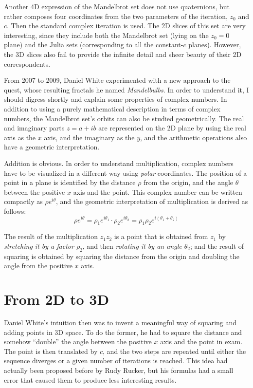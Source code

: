 \documentclass{article}
\begin{document}
Another 4D expression of the Mandelbrot set does not use quaternions,
but rather composes four coordinates from the two parameters of
the iteration, $z_0$ and $c$.  Then the standard complex iteration
is used.  The 2D slices of this set are very interesting, since
they include both the Mandelbrot set (lying on the $z_0=0$ plane)
and the Julia sets (corresponding to all the constant-$c$ planes).
However, the 3D slices also fail to provide the infinite detail
and sheer beauty of their 2D correspondents.

From 2007 to 2009, Daniel White experimented with a new approach to
the quest, whose resulting fractals he named \emph{Mandelbulbs}.  In
order to understand it, I should digress shortly and explain some
properties of complex numbers.  In addition to using a purely
mathematical description in terms of complex numbers, the Mandelbrot
set's orbits can also be studied geometrically.  The real and
imaginary parts $z=a+ib$ are represented on the 2D plane by using the
real axis as the $x$ axis, and the imaginary as the $y$, and the
arithmetic operations also have a geometric interpretation.

Addition is obvious.  In order to understand multiplication, complex
numbers have to be visualized in a different way using \emph{polar}
coordinates.  The position of a point in a plane is identified by the
distance $\rho$ from the origin, and the angle $\theta$ between the
positive $x$ axis and the point.  This complex number can be written
compactly as $\rho e^{i \theta}$, and the geometric interpretation
of multiplication is derived as follows:
\begin{equation*}
  \rho e^{i \theta} =  \rho_1 e^{i \theta_1} \cdot \rho_2 e^{i \theta_2}
    = \rho_1\rho_2 e^{i (\theta_1 + \theta_2)}
\end{equation*}
  
\noindent
The result of the multiplication $z_1 z_2$ is a point that is obtained
from $z_1$ by \emph{stretching it by a factor $\rho_2$}, and
then \emph{rotating it by an angle $\theta_2$}; and the result of
squaring is obtained by squaring the distance from the origin and
doubling the angle from the positive $x$ axis.

\section{From 2D to 3D}
\label{sec:2d-3d}

Daniel White's intuition then was to invent a meaningful way of squaring
and adding points in 3D space.  To do the former, he had to square
the distance and somehow ``double'' the angle between the positive $x$
axis and the point in exam.  The point is then translated by $c$, and
the two steps are repeated until either the sequence diverges or a given
number of iterations is reached.  This idea had actually been proposed
before by Rudy Rucker, but his formulas had a small error that caused
them to produce less interesting results.
\end{document}
